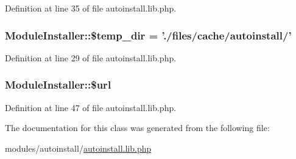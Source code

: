 Definition at line 35 of file autoinstall.\+lib.\+php.

\hypertarget{classModuleInstaller_a65850d513e6f6fdae18ee0654efb956c}{
\subsubsection[{\$temp\+\_\+dir}]{\setlength{\rightskip}{0pt plus 5cm}Module\+Installer\+::\$temp\+\_\+dir = './files/cache/{\bf autoinstall}/'}}\label{classModuleInstaller_a65850d513e6f6fdae18ee0654efb956c}


Definition at line 29 of file autoinstall.\+lib.\+php.

\hypertarget{classModuleInstaller_a01a6bf5f232c00fff146a58fb8c14b84}{
\subsubsection[{\$url}]{\setlength{\rightskip}{0pt plus 5cm}Module\+Installer\+::\$url}}\label{classModuleInstaller_a01a6bf5f232c00fff146a58fb8c14b84}


Definition at line 47 of file autoinstall.\+lib.\+php.



The documentation for this class was generated from the following file\+:\begin{DoxyCompactItemize}
\item 
modules/autoinstall/\hyperlink{autoinstall_8lib_8php}{autoinstall.\+lib.\+php}\end{DoxyCompactItemize}
